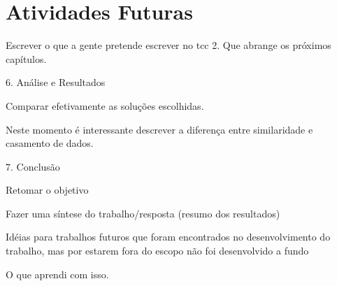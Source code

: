 \chapter{Atividades Futuras}
Escrever o que a gente pretende escrever no tcc 2. Que abrange os próximos capítulos.

6. Análise e Resultados

Comparar efetivamente as soluções escolhidas.

Neste momento é interessante descrever a diferença entre similaridade e casamento de dados.

7. Conclusão

Retomar o objetivo

Fazer uma síntese do trabalho/resposta (resumo dos resultados)

Idéias para trabalhos futuros que foram encontrados no desenvolvimento do trabalho, mas por estarem fora do escopo não foi desenvolvido a fundo

O que aprendi com isso.